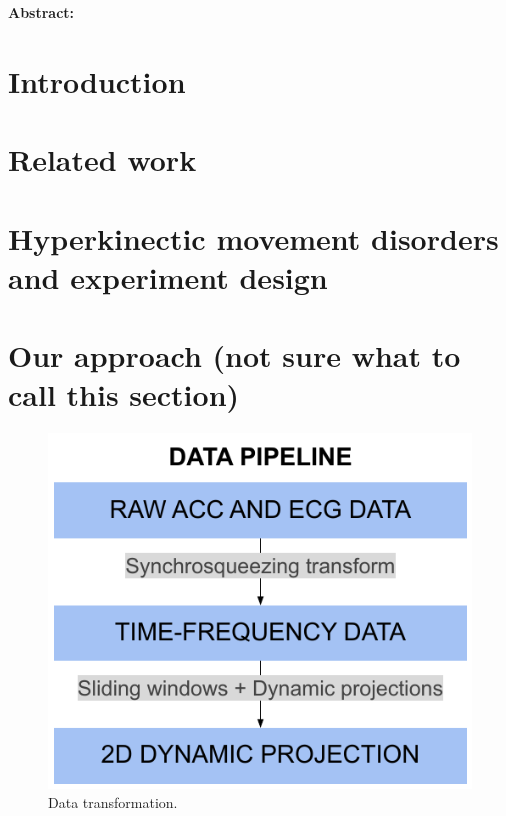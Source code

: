 
\noindent \textbf{Abstract:}

\section{Introduction}

\section{Related work}

\section{Hyperkinectic movement disorders and experiment design}

\section{Our approach (not sure what to call this section)}

\begin{figure}[ht]
\centering
\includegraphics[width=.5\linewidth]{figures/nemo/simple-pipeline.pdf}
\caption{Data transformation.}
\label{fig:nemo-pipe}
\end{figure}


